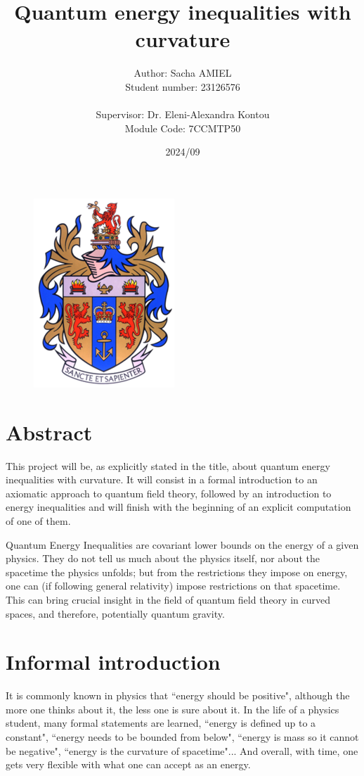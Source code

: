 \documentclass[a4paper,11pt]{article}
\title{Quantum energy inequalities with curvature}
\author{Author: Sacha AMIEL \\
Student number: 23126576\\
\\ Supervisor: Dr. Eleni-Alexandra Kontou \\ Module Code: 7CCMTP50}
\date{2024/09}
\numberwithin{equation}{section}
\theoremstyle{definition}
\begin{document}
\clearpage\maketitle
\thispagestyle{empty}
\begin{figure}[H]
    \centering
    \vspace{100mm}
    \includegraphics[width=0.2\columnwidth]{Template/kcl_logo.png}
\end{figure}

\newpage
\section*{Abstract}
This project will be, as explicitly stated in the title, about quantum energy inequalities with curvature. It will consist in a formal introduction to an axiomatic approach to quantum field theory, followed by an introduction to energy inequalities and will finish with the beginning of an explicit computation of one of them.

Quantum Energy Inequalities are covariant lower bounds on the energy of a given physics. They do not tell us much about the physics itself, nor about the spacetime the physics unfolds; but from the restrictions they impose on energy, one can (if following general relativity) impose restrictions on that spacetime. This can bring crucial insight in the field of quantum field theory in curved spaces, and therefore, potentially quantum gravity.

\section*{Informal introduction}
It is commonly known in physics that ``energy should be positive", although the more one thinks about it, the less one is sure about it. In the life of a physics student, many formal statements are learned, ``energy is defined up to a constant", ``energy needs to be bounded from below", ``energy is mass so it cannot be negative", ``energy is the curvature of spacetime"... And overall, with time, one gets very flexible with what one can accept as an energy.
\end{document}
